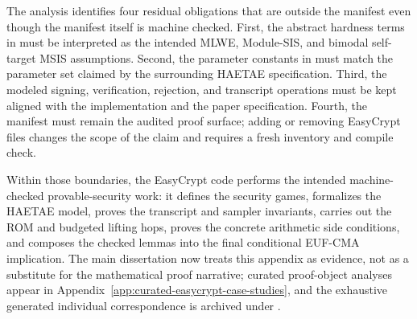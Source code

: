 The analysis identifies four residual obligations that are outside the manifest
even though the manifest itself is machine checked.  First, the abstract hardness
terms in  must be interpreted as the intended
MLWE, Module-SIS, and bimodal self-target MSIS assumptions.  Second, the
parameter constants in  must match the parameter set
claimed by the surrounding HAETAE specification.  Third, the modeled signing,
verification, rejection, and transcript operations must be kept aligned with the
implementation and the paper specification.  Fourth, the manifest
 must remain the audited proof surface;
adding or removing EasyCrypt files changes the scope of the claim and requires a
fresh inventory and compile check.

Within those boundaries, the EasyCrypt code performs the intended
machine-checked provable-security work: it defines the security games, formalizes
the HAETAE model, proves the transcript and sampler invariants, carries out the
ROM and budgeted lifting hops, proves the concrete arithmetic side conditions,
and composes the checked lemmas into the final conditional EUF-CMA implication.
The
main dissertation now treats this appendix as evidence, not as a substitute for
the mathematical proof narrative; curated proof-object analyses appear in
Appendix~\ref{app:curated-easycrypt-case-studies}, and the exhaustive generated
individual correspondence is archived under .
